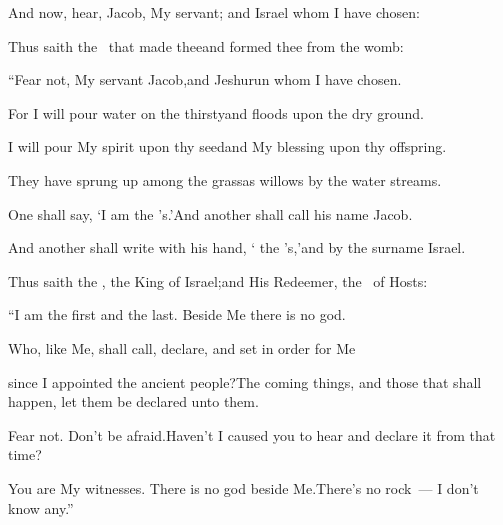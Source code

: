 
\begin{inparaenum}
   And now, hear, Jacob, My servant; and Israel whom I have chosen:%

  \pa{} Thus saith the \lord\ that made thee\pa{}and formed thee from the womb:%

  \pa{}``Fear not, My servant Jacob,\pa{}and Jeshurun whom I have chosen.%

  \pa{} For I will pour water on the thirsty\pa{}and floods upon the dry ground.%

  \pa{}I will pour My spirit upon thy seed\pa{}and My blessing upon thy offspring.%

  \pa{} They have sprung up among the grass\pa{}as willows by the water streams.%

  \pa{} One shall say, `I am the \lord's.'\pa{}And another shall call his name Jacob.%

  \pa{}And another shall write with his hand, ` the \lord's,'\pa{}and by the surname Israel.%

  \pb{} Thus saith the \lord, the King of Israel;\pa{}and His Redeemer, the \lord\ of Hosts:%

  \pb{}``I am the first and the last. Beside Me there is no god.%

  \pb{} Who, like Me, shall call, declare, and set in order for Me%

  \pb{}since I appointed the ancient people?\pa{}The coming things, and those that shall happen, let them be declared unto them.%

  \pb{} Fear not. Don't be afraid.\pa{}Haven't I caused you to hear and declare it from that time?%

  \pb{}You are My witnesses. There is no god beside Me.\pa{}There's no rock~---  I don't know any.''%
\end{inparaenum}
